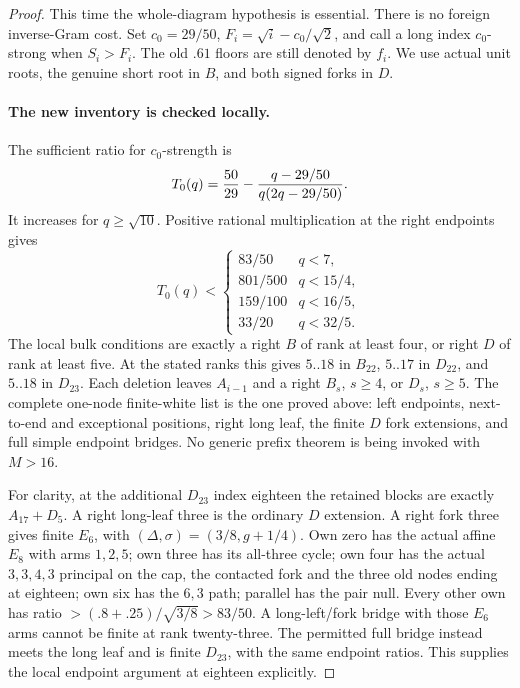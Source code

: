 \begin{proof}
This time the whole-diagram hypothesis is essential. There is no
foreign inverse-Gram cost. Set $c_0=29/50$, $F_i=\sqrt i-c_0/\sqrt2$,
and call a long index $c_0$-strong when $S_i>F_i$. The old $.61$
floors are still denoted by $f_i$. We use actual unit roots, the
genuine short root in $B$, and both signed forks in $D$.

\paragraph{The new inventory is checked locally.}
The sufficient ratio for $c_0$-strength is
\[
 T_0(q)={50\over29}-{q-29/50\over q(2q-29/50)}.
\]
It increases for $q\ge\sqrt{10}$. Positive rational multiplication
at the right endpoints gives
\[
 T_0(q)<\begin{cases}
 83/50&q<7,\\801/500&q<15/4,\\159/100&q<16/5,\\33/20&q<32/5.
 \end{cases}
\]
The local bulk conditions are exactly a right $B$ of rank at least
four, or right $D$ of rank at least five. At the stated ranks this
gives $5..18$ in $B_{22}$, $5..17$ in
$D_{22}$, and $5..18$ in $D_{23}$. Each deletion leaves $A_{i-1}$
and a right $B_s$, $s\ge4$, or $D_s$, $s\ge5$. The complete
one-node finite-white list is the one proved above: left endpoints,
next-to-end and exceptional positions, right long leaf, the finite
$D$ fork extensions, and full simple endpoint bridges. No generic
prefix theorem is being invoked with $M>16$.

For clarity, at the additional $D_{23}$ index eighteen the retained
blocks are exactly $A_{17}+D_5$. A right long-leaf three is the
ordinary $D$ extension. A right fork three gives finite $E_6$,
with $(\Delta,\sigma)=(3/8,g+1/4)$. Own zero has the actual
affine $E_8$ with arms $1,2,5$; own three has its all-three cycle;
own four has the actual $3,3,4,3$ principal on the cap, the
contacted fork and the three old nodes ending at eighteen;
own six has the $6,3$ path; parallel has the pair null.
Every other own has ratio $>(.8+.25)/\sqrt{3/8}>83/50$.
A long-left/fork bridge with those $E_6$ arms cannot be finite at
rank twenty-three. The permitted full bridge instead meets the
long leaf and is finite $D_{23}$, with the same endpoint ratios.
This supplies the local endpoint argument at eighteen explicitly.


\end{proof}
